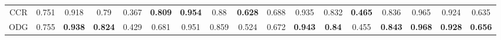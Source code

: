 \documentclass[runningheads]{llncs}
\begin{document}
\begin{table}[htbp]
{\begin{tabular}{@{}ccccccccccccccccc@{}}
        CCR                                             & 0.751                            & 0.918                                        & 0.79                       & 0.367                         & \textbf{0.809}                   & \textbf{0.954}                               & 0.88                       & \textbf{0.628}                & 0.688                            & 0.935                                        & 0.832                      & \textbf{0.465}                & 0.836                            & 0.965                                        & 0.924                      & 0.635                         \\
        ODG                                             & 0.755                            & \textbf{0.938}                               & \textbf{0.824}             & 0.429                         & 0.681                            & 0.951                                        & 0.859                      & 0.524                         & 0.672                            & \textbf{0.943}                               & \textbf{0.84}              & 0.455                         & \textbf{0.843}                   & \textbf{0.968}                               & \textbf{0.928}             & \textbf{0.656}                \\ \bottomrule
        \end{tabular}
        }
\end{table}
\end{document}
